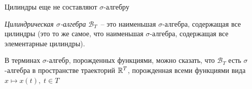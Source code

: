 \begin{note}
    Цилиндры еще не составляют $\sigma$-алгебру
\end{note}

\begin{definition}
    \textit{Цилиндрическая $\sigma$-алгебра} $\mathcal{B}_T$~-- это наименьшая $\sigma$-алгебра, содержащая все цилиндры (это то же самое, что наименьшая $\sigma$-алгебра, содержащая все элементарные цилиндры).
\end{definition}

\begin{note}
    В терминах $\sigma$-алгебр, порожденных функциями, можно сказать, что $\mathcal{B}_T$ есть $\sigma$-алгебра в пространстве траекторий $\mathbb{R}^T$, порожденная всеми функциями вида $x \mapsto x(t), \; t \in T$
\end{note}